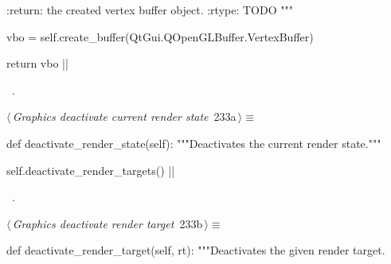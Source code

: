 \documentclass[%
    a4paper,    %
    justified,  %
    nobib,      %
    openany     %
]{tufte-book}
\makeatletter
\renewcommand{\label}[1]{\@tufte@label{##1}}%
\makeatother
\begin{document}
\begin{fullwidth}
\begin{flushleft}
\begin{minipage}{\linewidth}
\begin{pythoncode}
    :return: the created vertex buffer object.
    :rtype:  TODO
    """

    vbo = self.create_buffer(QtGui.QOpenGLBuffer.VertexBuffer)

    return vbo
|\NWsep|
\end{pythoncode}
\vspace{1.5ex}
\footnotesize
\begin{list}{}{\setlength{\itemsep}{-\parsep}\setlength{\itemindent}{-\leftmargin}}
\item \NWtxtMacroRefIn\ .

\item{}
\end{list}
\end{minipage}\vspace{4ex}
\end{flushleft}
\begin{flushleft} \small
\begin{minipage}{\linewidth}\label{scrap247}\raggedright\small
{} $\langle\,${\itshape Graphics deactivate current render state}\nobreak\ {\footnotesize {233a}}$\,\rangle\equiv$
\vspace{-1ex}
\begin{pythoncode}
def deactivate_render_state(self):
    """Deactivates the current render state."""

    self.deactivate_render_targets()
|\NWsep|
\end{pythoncode}
\vspace{1.5ex}
\footnotesize
\begin{list}{}{\setlength{\itemsep}{-\parsep}\setlength{\itemindent}{-\leftmargin}}
\item \NWtxtMacroRefIn\ .

\item{}
\end{list}
\end{minipage}\vspace{4ex}
\end{flushleft}
\begin{flushleft} \small
\begin{minipage}{\linewidth}\label{scrap248}\raggedright\small
{} $\langle\,${\itshape Graphics deactivate render target}\nobreak\ {\footnotesize {233b}}$\,\rangle\equiv$
\vspace{-1ex}
\begin{pythoncode}
def deactivate_render_target(self, rt):
    """Deactivates the given render target.


\end{pythoncode}
\end{minipage}
\end{flushleft}
\end{fullwidth}
\end{document}

